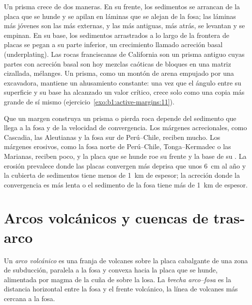 Un prisma crece de dos maneras. En su frente, los sedimentos se arrancan de la placa que se hunde y se apilan en láminas que se alejan de la
fosa; las láminas más jóvenes son las más externas, y las más antiguas, más atrás, se levantan y se empinan. En su base, los sedimentos
arrastrados a lo largo de la frontera de placas se pegan a su parte inferior, un crecimiento llamado acreción basal (underplating).
Las rocas franciscanas de California son un prisma antiguo cuyas partes con acreción basal son hoy mezclas caóticas de bloques en una matriz
cizallada, mélanges. Un prisma, como un montón de arena empujado por una excavadora, mantiene un ahusamiento constante: una vez que el ángulo
entre su superficie y su base ha alcanzado un valor crítico, crece solo como una copia más grande de sí mismo (ejercicio~\ref{exo:b1:active-margins:11}).

Que un margen construya un prisma o pierda roca depende del sedimento que llega a la fosa y de la velocidad de convergencia. Los márgenes
acrecionales, como Cascadia, las Aleutianas y la fosa sur de Perú--Chile, reciben mucho. Los márgenes erosivos, como la fosa norte de
Perú--Chile, Tonga--Kermadec o las Marianas, reciben poco, y la placa que se hunde roe su frente y la base de su . La erosión prevalece
donde las placas convergen más deprisa que unos \qty{6}{cm} al año y la cubierta de sedimentos tiene menos de \qty{1}{km} de espesor; la
acreción donde la convergencia es más lenta o el sedimento de la fosa tiene más de \qty{1}{km} de espesor.

\section{Arcos volcánicos y cuencas de tras-arco}\label{sec:b1:active-margins:arcs}

\begin{definition}\label{def:b1:active-margins:volcanic-arc}
Un \emph{arco volcánico} es una franja de volcanes sobre la placa cabalgante de una zona de subducción, paralela a la fosa
y convexa hacia la placa que se hunde, alimentada por magma de la cuña de  sobre la losa. La \emph{brecha arco--fosa} es la distancia horizontal entre la fosa y el frente volcánico, la línea de volcanes más cercana a la fosa.
\end{definition}

